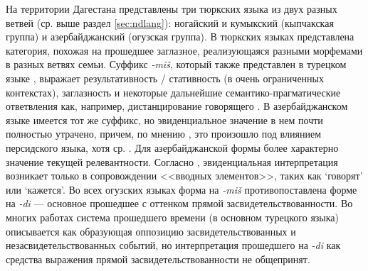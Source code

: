 На территории Дагестана представлены три тюркских языка из двух разных ветвей (ср. выше раздел \ref{sec:ndlang}): ногайский и кумыкский (кыпчакская группа) и азербайджанский (огузская группа). В тюркских языках представлена категория, похожая на прошедшее заглазное, реализующаяся разными морфемами в разных ветвях семьи. Суффикс \textit{-miš}, который также представлен в турецком языке \citep{slobinaksukoc1986}, выражает результативность / стативность (в очень ограниченных контекстах), заглазность и некоторые дальнейшие семантико-прагматические ответвления как, например, дистанцирование говорящего \citep{slobinaksukoc1986, slobinaksukoc1982}. В азербайджанском языке имеется тот же суффикс, но эвиденциальное значение в нем почти полностью утрачено, причем, по мнению \citep{johanson2018}, это произошло под влиянием персидского языка, хотя ср. \citep{lazard2000}. Для азербайджанской формы более характерно значение текущей релевантности. Согласно \citep[127]{shiralievsevortyan1971}, эвиденциальная интерпретация возникает только в сопровождении <<вводных элементов>>, таких как `говорят' или `кажется'. Во всех огузских языках форма на \textit{-miš} противопоставлена форме на \textit{-di} --- основное прошедшее с оттенком прямой засвидетельствованности. Во многих работах система прошедшего времени (в основном турецкого языка) описывается как образующая оппозицию засвидетельствованных и незасвидетельствованных событий, но интерпретация прошедшего на \textit{-di} как средства выражения прямой засвидетельствованности не общепринят. 
